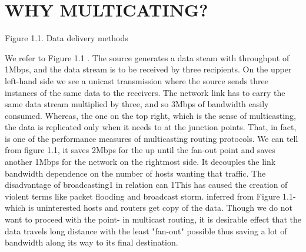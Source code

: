 \documentclass[11pt,left=2cm,bottom=2cm,oneside]{book}
\begin{document}
\section{WHY MULTICATING?}
Figure 1.1. Data delivery methods
\begin{flushleft}\end{flushleft}
We refer to Figure 1.1 . The source generates a data steam with throughput
of 1Mbps, and the data stream is to be received by three recipients. On the upper
left-hand side we see a unicast transmission where the source sends three instances
of the same data to the receivers. The network link has to carry the same data
stream multiplied by three, and so 3Mbps of bandwidth easily consumed. Whereas,
the one on the top right, which is the sense of multicasting, the data is replicated
only when it needs to at the junction points. That, in fact, is one of the performance
measures of multicasting routing protocols. We can tell from figure 1.1, it saves
2Mbps for the up until the fan-out point and saves another 1Mbps for the network
on the rightmost side. It decouples the link bandwidth dependence on the number
of hosts wanting that traffic. The disadvantage of broadcasting1 in relation can
1This has caused the creation of violent terms like packet ﬂooding and broadcast storm.
inferred from Figure 1.1- which is uninterested hosts and routers get copy of the
data. Though we do not want to proceed with the point- in multicast routing, it is
desirable effect that the data travels long distance with the least "fan-out" possible
thus saving a lot of bandwidth along its way to its final destination.
\end{document}
